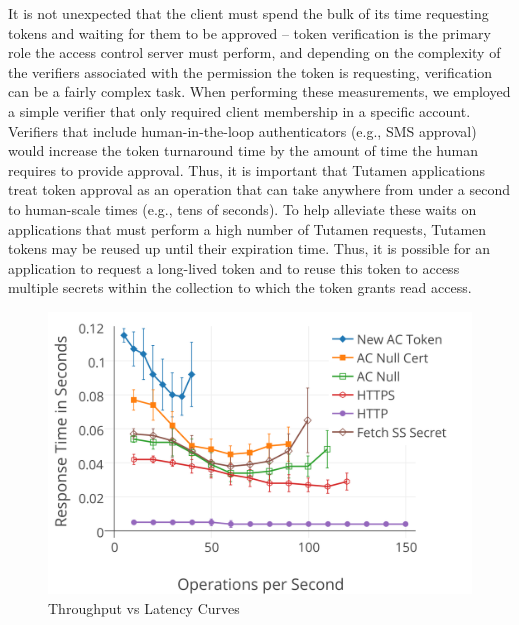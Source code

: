 It is not unexpected that the client must spend the bulk of its time
requesting tokens and waiting for them to be approved -- token
verification is the primary role the access control server must
perform, and depending on the complexity of the verifiers associated
with the permission the token is requesting, verification can be a
fairly complex task. When performing these measurements, we employed a
simple verifier that only required client membership in a specific
account. Verifiers that include human-in-the-loop authenticators
(e.g., SMS approval) would increase the token turnaround time by the
amount of time the human requires to provide approval. Thus, it is
important that Tutamen applications treat token approval as an
operation that can take anywhere from under a second to human-scale
times (e.g., tens of seconds). To help alleviate these waits on
applications that must perform a high number of Tutamen requests,
Tutamen tokens may be reused up until their expiration time. Thus, it
is possible for an application to request a long-lived token and to
reuse this token to access multiple secrets within the collection to
which the token grants read access.
 
\begin{figure}[th]
  \centering
  \includegraphics[width=\columnwidth]{./figs/png/chart-iops.png}
  \caption{Throughput vs Latency Curves}
  \label{fig:eval:iops}
\end{figure}

